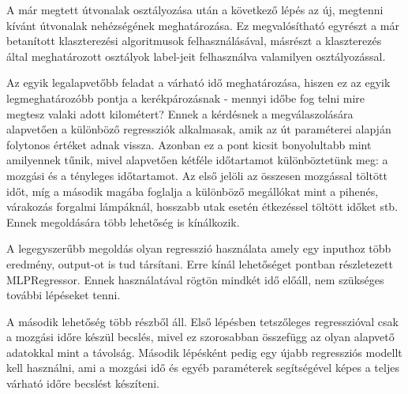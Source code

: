 A már megtett útvonalak osztályozása után a következő lépés az új, megtenni kívánt útvonalak nehézségének meghatározása. Ez megvalósítható egyrészt a már betanított klaszterezési algoritmusok felhasználásával, másrészt a klaszterezés által meghatározott osztályok label-jeit felhasználva valamilyen osztályozással. 



Az egyik legalapvetőbb feladat a várható idő meghatározása, hiszen ez az egyik legmeghatározóbb pontja a kerékpározásnak - mennyi időbe fog telni mire megtesz valaki adott kilométert? Ennek a kérdésnek a megválaszolására alapvetően a különböző regressziók alkalmasak, amik az út paraméterei alapján folytonos értéket adnak vissza. Azonban ez a pont kicsit bonyolultabb mint amilyennek tűnik, mivel alapvetően kétféle időtartamot különböztetünk meg: a mozgási és a tényleges időtartamot. Az első jelöli az összesen mozgással töltött időt, míg a második magába foglalja a különböző megállókat mint a pihenés, várakozás forgalmi lámpáknál, hosszabb utak esetén étkezéssel töltött időket stb. Ennek megoldására több lehetőség is kínálkozik.

A legegyszerűbb megoldás olyan regresszió használata amely egy inputhoz több eredmény, output-ot is tud társítani. Erre kínál lehetőséget  pontban részletezett MLPRegressor. Ennek használatával rögtön mindkét idő előáll, nem szükséges további lépéseket tenni.

A második lehetőség több részből áll. Első lépésben tetszőleges regresszióval csak a mozgási időre készül becslés, mivel ez szorosabban összefügg  az olyan alapvető adatokkal mint a távolság. Második lépésként pedig egy újabb regressziós modellt kell használni, ami a mozgási idő és egyéb paraméterek segítségével képes a teljes várható időre becslést készíteni.






